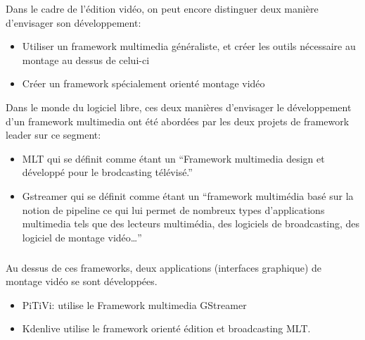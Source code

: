 {Dans le cadre de l'édition vidéo, on peut encore distinguer deux manière
d'envisager son développement:

\begin {itemize}

  \item {Utiliser un framework multimedia généraliste, et créer les
  outils nécessaire
         au montage au dessus de celui-ci} %

  \item {Créer un framework spécialement orienté montage vidéo}

\end {itemize}

Dans le monde du logiciel libre, ces deux manières d'envisager le
développement d'un framework multimedia ont été abordées par les deux
projets de framework leader sur ce segment:

\begin {itemize}

  \item {MLT qui se définit comme étant un ``Framework multimedia design
    et développé pour le brodcasting télévisé.''}

  \item {Gstreamer qui se définit comme étant un ``framework multimédia
    basé sur la notion de pipeline ce qui lui permet de nombreux types
    d'applications multimedia tels que des lecteurs multimédia, des
    logiciels de broadcasting, des logiciel de montage vidéo\ldots''}

\end {itemize}

\subparagraph {}

Au dessus de ces frameworks, deux applications (interfaces graphique)
de montage vidéo se sont développées.

\begin {itemize}

  \item {PiTiVi: utilise le Framework multimedia GStreamer}

  \item {Kdenlive utilise le framework orienté édition et
    broadcasting MLT.}

\end {itemize}

\paragraph {}

}
